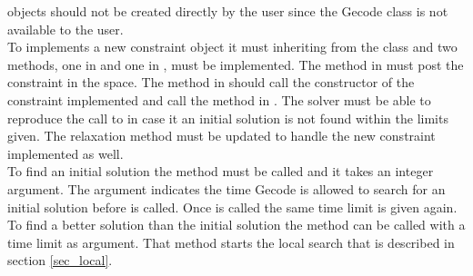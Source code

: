 objects should not be created directly by the user since the Gecode  class is not available to the 
user. \\ 
To implements a new constraint object it must inheriting from the  class 
and two methods, one in  and one in , must be implemented. The method in 
 must post the constraint in the  space. The method in  
should call the constructor of the constraint implemented and call the method in . The solver must 
be able to reproduce the call to  in case it an initial solution is not found within the limits 
given. The relaxation method must be updated to handle the new constraint implemented as well. \\
To find an initial solution the method  must be called and it takes an integer argument. The 
argument indicates the time Gecode is allowed to search for an initial solution before  is called. Once 
 is called the same time limit is given again. \\
To find a better solution than the initial solution the method  can be called with a time 
limit as argument. That method starts the local search that is described in section \ref{sec_local}. 